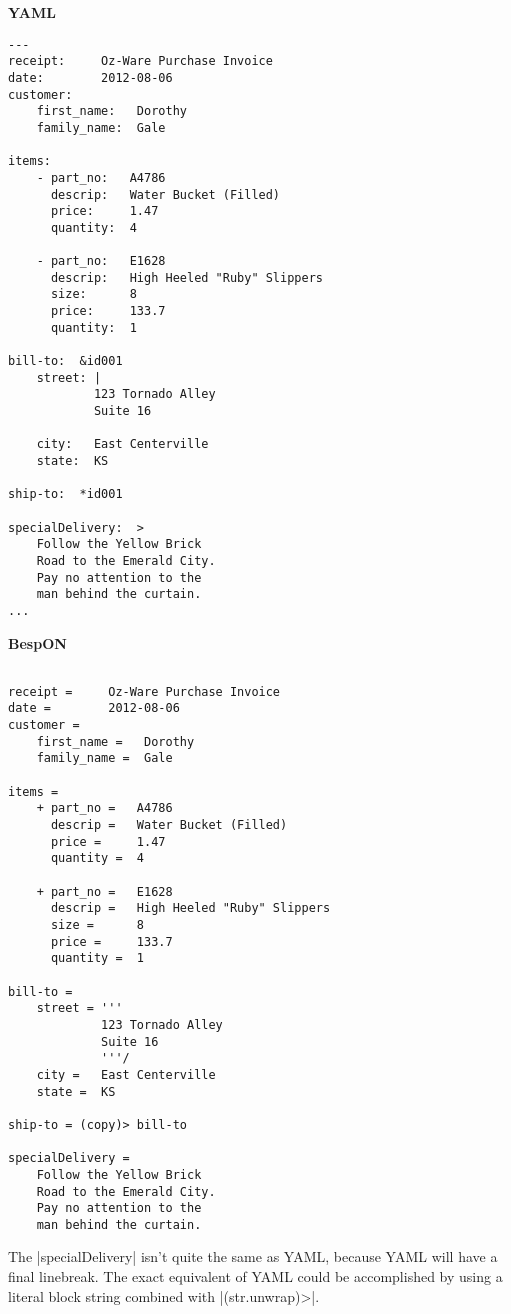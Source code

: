 \documentclass[11pt]{article}
\begin{document}
\begin{appendices}
\begin{tcolorbox}{}
\begin{multicols}{2}
\centering \textbf{YAML}
\begin{Verbatim}[formatcom=\color{DarkGreen}]
---
receipt:     Oz-Ware Purchase Invoice
date:        2012-08-06
customer:
    first_name:   Dorothy
    family_name:  Gale

items:
    - part_no:   A4786
      descrip:   Water Bucket (Filled)
      price:     1.47
      quantity:  4

    - part_no:   E1628
      descrip:   High Heeled "Ruby" Slippers
      size:      8
      price:     133.7
      quantity:  1

bill-to:  &id001
    street: |
            123 Tornado Alley
            Suite 16

    city:   East Centerville
    state:  KS

ship-to:  *id001

specialDelivery:  >
    Follow the Yellow Brick
    Road to the Emerald City.
    Pay no attention to the
    man behind the curtain.
...
\end{Verbatim}
\columnbreak
\centering \textbf{BespON}

\begin{Verbatim}

receipt =     Oz-Ware Purchase Invoice
date =        2012-08-06
customer =
    first_name =   Dorothy
    family_name =  Gale

items =
    + part_no =   A4786
      descrip =   Water Bucket (Filled)
      price =     1.47
      quantity =  4

    + part_no =   E1628
      descrip =   High Heeled "Ruby" Slippers
      size =      8
      price =     133.7
      quantity =  1

bill-to =
    street = '''
             123 Tornado Alley
             Suite 16
             '''/
    city =   East Centerville
    state =  KS

ship-to = (copy)> bill-to

specialDelivery = 
    Follow the Yellow Brick
    Road to the Emerald City.
    Pay no attention to the
    man behind the curtain.

\end{Verbatim}
\end{multicols}
\end{tcolorbox}
The |specialDelivery| isn't quite the same as YAML, because YAML will have a final linebreak.  The exact equivalent of YAML could be accomplished by using a literal block string combined with |(str.unwrap)>|.




\end{appendices}
\end{document}
